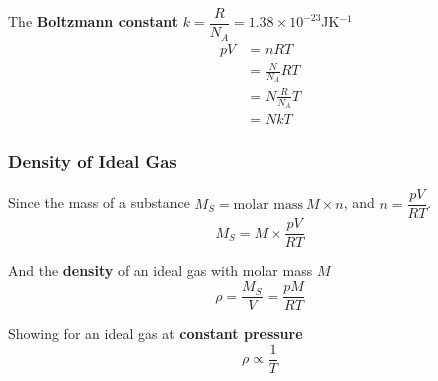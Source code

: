 The \textbf{Boltzmann constant} $k=\dfrac{R}{N_A}=1.38\times10^{-23}$JK$^{-1}$
\begin{align*}
    pV&=nRT\\
      &=\frac{N}{N_A}RT\\
      &=N\frac{R}{N_A}T\\
      &=NkT
\end{align*}

\subsubsection*{Density of Ideal Gas}
Since the mass of a substance $M_S=\text{molar mass}\ M\times n$, and $n=\dfrac{pV}{RT}$.
$$M_S=M\times\frac{pV}{RT}$$

And the \textbf{density} of an ideal gas with molar mass $M$
$$\rho=\frac{M_S}{V}=\frac{pM}{RT}$$

Showing for an ideal gas at \textbf{constant pressure}
$$\rho\propto\frac{1}{T}$$
